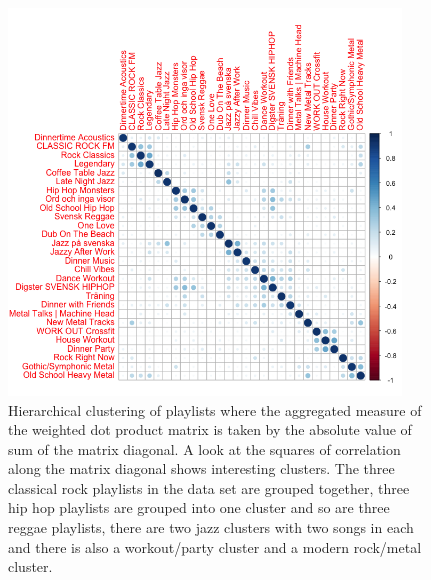 \documentclass[a4paper,11pt]{kth-mag}
\begin{document}
\begin{figure}
\centering
\includegraphics[width=0.93\textwidth]{images/absSum.png}
\caption{Hierarchical clustering of playlists where the aggregated measure of the weighted dot product matrix is taken by the absolute value of sum of the matrix diagonal. A look at the squares of correlation along the matrix diagonal shows interesting clusters. The three classical rock playlists in the data set are grouped together, three hip hop playlists are grouped into one cluster and so are three reggae playlists, there are two jazz clusters with two songs in each and there is also a workout/party cluster and a modern rock/metal cluster.}
\label{absSum}
\end{figure}
\end{document}

